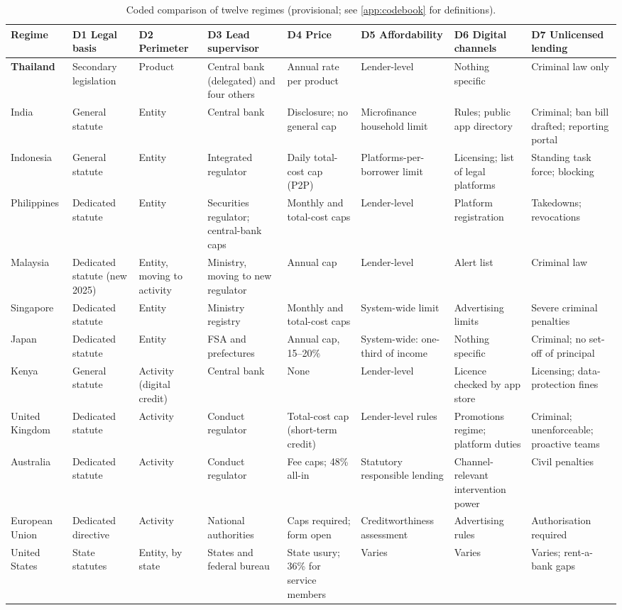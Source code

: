 \documentclass[11pt]{article}
\renewcommand{\arraystretch}{1.18}
\theoremstyle{plain}
\theoremstyle{definition}
\theoremstyle{remark}
\begin{document}
\begin{table}[htbp]
\centering\scriptsize
\setlength{\tabcolsep}{3pt}
\renewcommand{\arraystretch}{1.25}
\caption{Coded comparison of twelve regimes (provisional; see \cref{app:codebook} for definitions).}
\label{tab:matrix}
\begin{tabularx}{\textwidth}{P{1.55cm}P{1.45cm}P{1.45cm}P{1.75cm}P{1.9cm}LP{1.95cm}P{1.95cm}}
\toprule
Regime & D1 Legal basis & D2 Perimeter & D3 Lead supervisor & D4 Price & D5 Affordability & D6 Digital channels & D7 Unlicensed lending \\
\midrule
{}\textbf{Thailand} & Secondary legislation & Product & Central bank (delegated) and four others & Annual rate per product & Lender-level & Nothing specific & Criminal law only \\
India & General statute & Entity & Central bank & Disclosure; no general cap & Microfinance household limit & Rules; public app directory & Criminal; ban bill drafted; reporting portal \\
Indonesia & General statute & Entity & Integrated regulator & Daily total-cost cap (P2P) & Platforms-per-borrower limit & Licensing; list of legal platforms & Standing task force; blocking \\
Philippines & Dedicated statute & Entity & Securities regulator; central-bank caps & Monthly and total-cost caps & Lender-level & Platform registration & Takedowns; revocations \\
Malaysia & Dedicated statute (new 2025) & Entity, moving to activity & Ministry, moving to new regulator & Annual cap & Lender-level & Alert list & Criminal law \\
Singapore & Dedicated statute & Entity & Ministry registry & Monthly and total-cost caps & System-wide limit & Advertising limits & Severe criminal penalties \\
Japan & Dedicated statute & Entity & FSA and prefectures & Annual cap, 15--20\% & System-wide: one-third of income & Nothing specific & Criminal; no set-off of principal \\
Kenya & General statute & Activity (digital credit) & Central bank & None & Lender-level & Licence checked by app store & Licensing; data-protection fines \\
United Kingdom & Dedicated statute & Activity & Conduct regulator & Total-cost cap (short-term credit) & Lender-level rules & Promotions regime; platform duties & Criminal; unenforceable; proactive teams \\
Australia & Dedicated statute & Activity & Conduct regulator & Fee caps; 48\% all-in & Statutory responsible lending & Channel-relevant intervention power & Civil penalties \\
European Union & Dedicated directive & Activity & National authorities & Caps required; form open & Creditworthiness assessment & Advertising rules & Authorisation required \\
United States & State statutes & Entity, by state & States and federal bureau & State usury; 36\% for service members & Varies & Varies & Varies; rent-a-bank gaps \\
\bottomrule
\end{tabularx}
\end{table}
\end{document}
